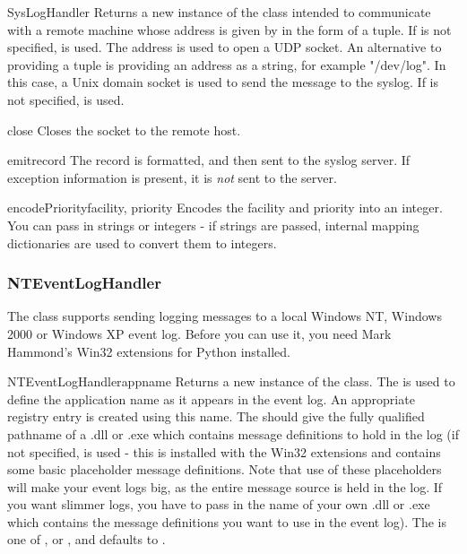 \begin{classdesc}{SysLogHandler}{}
Returns a new instance of the  class intended to
communicate with a remote \UNIX{} machine whose address is given by
 in the form of a 
tuple.  If  is not specified,  is
used.  The address is used to open a UDP socket.  An alternative to providing
a  tuple is providing an address as a string,
for example "/dev/log". In this case, a Unix domain socket is used to send
the message to the syslog. If  is not specified,
 is used.
\end{classdesc}

\begin{methoddesc}{close}{}
Closes the socket to the remote host.
\end{methoddesc}

\begin{methoddesc}{emit}{record}
The record is formatted, and then sent to the syslog server. If
exception information is present, it is \emph{not} sent to the server.
\end{methoddesc}

\begin{methoddesc}{encodePriority}{facility, priority}
Encodes the facility and priority into an integer. You can pass in strings
or integers - if strings are passed, internal mapping dictionaries are used
to convert them to integers.
\end{methoddesc}

\subsubsection{NTEventLogHandler}

The  class supports sending logging messages
to a local Windows NT, Windows 2000 or Windows XP event log. Before
you can use it, you need Mark Hammond's Win32 extensions for Python
installed.

\begin{classdesc}{NTEventLogHandler}{appname}
Returns a new instance of the  class. The
 is used to define the application name as it appears in the
event log. An appropriate registry entry is created using this name.
The  should give the fully qualified pathname of a .dll or .exe
which contains message definitions to hold in the log (if not specified,
 is used - this is installed with the Win32
extensions and contains some basic placeholder message definitions.
Note that use of these placeholders will make your event logs big, as the
entire message source is held in the log. If you want slimmer logs, you have
to pass in the name of your own .dll or .exe which contains the message
definitions you want to use in the event log). The  is one of
,  or , and
defaults to .
\end{classdesc}

